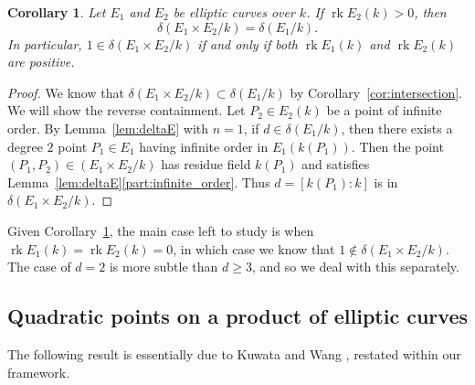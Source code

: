 \documentclass[a4paper,11pt]{amsart}
\theoremstyle{plain}
\newtheorem{coroll}[thm]{Corollary}
\theoremstyle{remark}
\newcommand{\rk}{\operatorname{rk}}
\newcommand{\dendegs}{\delta}
\begin{document}
\begin{coroll}\label{cor:prod_ell_curve_pos_rank}
    Let \(E_1\) and \(E_2\) be elliptic curves over \(k\).  If \(\rk E_2(k) >0\), then 
    \[\dendegs(E_1 \times E_2/k) = \dendegs(E_1/k).\]
    In particular, $1\in \dendegs(E_1\times E_2/k)$ if and only if both $\rk E_1(k)$ and $\rk E_2(k)$ are positive.
\end{coroll}
\begin{proof}
    We know that \(\dendegs(E_1 \times E_2/k) \subset \dendegs(E_1/k)\) by Corollary~\ref{cor:intersection}.  We will show the reverse containment.
    Let \(P_2 \in E_2(k)\) be a point of infinite order.  
    By Lemma~\ref{lem:deltaE} with \(n=1\), if \(d \in \dendegs(E_1/k)\), then there exists a degree \(2\) point \(P_1 \in E_1\) having infinite order in \(E_1(k(P_1))\).
    Then the point \((P_1,P_2) \in (E_1 \times E_2/k)\) has residue field \(k(P_1)\) and satisfies Lemma~\ref{lem:deltaE}\eqref{part:infinite_order}.  Thus \(d = [k(P_1):k]\) is in \(\dendegs(E_1 \times E_2/k)\). 
\end{proof}    


Given Corollary~\ref{cor:prod_ell_curve_pos_rank}, the main case left to study is when \(\rk E_1(k) = \rk E_2(k) = 0\), in which case we know that \(1 \not\in \dendegs(E_1 \times E_2/k)\).  The case of \(d=2\) is more subtle than \(d \geq 3\), and so we deal with this separately.

\subsection{Quadratic points on a product of elliptic curves}

 The following result is essentially due to Kuwata and Wang \cite{KW93}, restated within our framework. 
\end{document}
